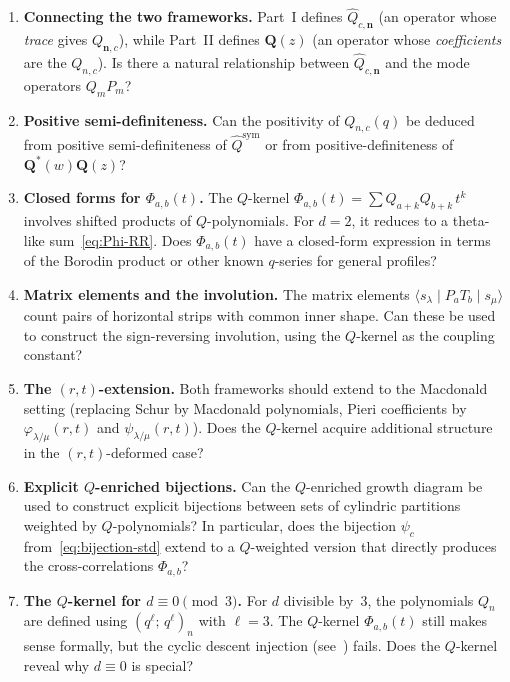 \documentclass[11pt]{article}
\theoremstyle{plain}
\theoremstyle{definition}
\begin{document}
\begin{enumerate}
  \item \textbf{Connecting the two frameworks.}
    Part~I defines $\hat{Q}_{c,\mathbf{n}}$ (an operator whose
    \emph{trace} gives $Q_{\mathbf{n},c}$), while Part~II defines
    $\mathbf{Q}(z)$ (an operator whose \emph{coefficients} are the
    $Q_{n,c}$).  Is there a natural relationship between
    $\hat{Q}_{c,\mathbf{n}}$ and the mode operators $Q_m P_m$?

  \item \textbf{Positive semi-definiteness.}
    Can the positivity of $Q_{n,c}(q)$ be deduced from
    positive semi-definiteness of $\hat{Q}^{\mathrm{sym}}$ or
    from positive-definiteness of
    $\mathbf{Q}^*(w)\mathbf{Q}(z)$?

  \item \textbf{Closed forms for $\Phi_{a,b}(t)$.}
    The $Q$-kernel $\Phi_{a,b}(t) = \sum Q_{a+k} Q_{b+k}\, t^k$
    involves shifted products of $Q$-polynomials.  For $d = 2$, it
    reduces to a theta-like sum~\eqref{eq:Phi-RR}.  Does
    $\Phi_{a,b}(t)$ have a closed-form expression in terms of the
    Borodin product or other known $q$-series for general
    profiles?

  \item \textbf{Matrix elements and the involution.}
    The matrix elements
    $\langle s_\lambda \mid P_a T_b \mid s_\mu \rangle$ count
    pairs of horizontal strips with common inner shape.  Can these
    be used to construct the sign-reversing involution, using the
    $Q$-kernel as the coupling constant?

  \item \textbf{The $(r,t)$-extension.}
    Both frameworks should extend to the Macdonald setting
    (replacing Schur by Macdonald polynomials, Pieri coefficients
    by $\varphi_{\lambda/\mu}(r,t)$ and
    $\psi_{\lambda/\mu}(r,t)$).
    Does the $Q$-kernel acquire additional structure in the
    $(r,t)$-deformed case?

  \item \textbf{Explicit $Q$-enriched bijections.}
    Can the $Q$-enriched growth diagram be used to construct
    explicit bijections between sets of cylindric partitions
    weighted by $Q$-polynomials?  In particular, does the
    bijection $\psi_c$ from~\eqref{eq:bijection-std} extend to a
    $Q$-weighted version that directly produces the
    cross-correlations $\Phi_{a,b}$?

  \item \textbf{The $Q$-kernel for $d \equiv 0 \pmod{3}$.}
    For $d$ divisible by~$3$, the polynomials $Q_n$ are defined
    using $(q^\ell;\, q^\ell)_n$ with $\ell = 3$.  The
    $Q$-kernel $\Phi_{a,b}(t)$ still makes sense formally, but the
    cyclic descent injection (see~\cite{FIRST_ATTEMPT}) fails.
    Does the $Q$-kernel reveal why $d \equiv 0$ is special?
\end{enumerate}
\end{document}
